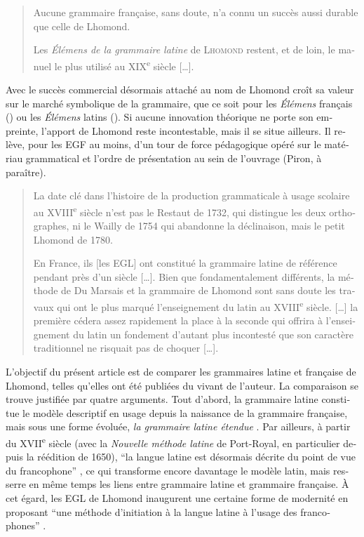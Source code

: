\documentclass[french,output=paper,colorlinks,citecolor=brown]{../langscibook}
\begin{document}
\begin{otherlanguage}{french}
\begin{quote}
    Aucune grammaire française, sans doute, n’a connu un succès aussi durable que celle de Lhomond. \citep[63]{Chervel1977}

    Les \textit{Élémens de la grammaire latine} de \textsc{Lhomond} restent, et de loin, le manuel le plus utilisé au XIX\textsuperscript{e} siècle […]. \citep[16]{Chervel1979}
\end{quote}

Avec le succès commercial désormais attaché au nom de Lhomond croît sa valeur sur le marché symbolique de la grammaire, que ce soit pour les \textit{Élémens} français (\citealt{Chervel1977, Chervel2006, ColombatEtAl2010}) ou les \textit{Élémens} latins (\citealt{Chervel1977, Colombat1999}). Si aucune innovation théorique ne porte son empreinte, l’apport de Lhomond reste incontestable, mais il se situe ailleurs. Il relève, pour les EGF au moins, d’un tour de force pédagogique opéré sur le matériau grammatical et l’ordre de présentation au sein de l’ouvrage (Piron, à paraître). 

\begin{quote}
La date clé dans l’histoire de la production grammaticale à usage scolaire au XVIII\textsuperscript{e} siècle n’est pas le Restaut de 1732, qui distingue les deux orthographes, ni le Wailly de 1754 qui abandonne la déclinaison, mais le petit Lhomond de 1780. \citep[220]{Chervel2006}

En France, ils [les EGL] ont constitué la grammaire latine de référence pendant près d’un siècle […]. Bien que fondamentalement différents, la méthode de Du Marsais et la grammaire de Lhomond sont sans doute les travaux qui ont le plus marqué l’enseignement du latin au XVIII\textsuperscript{e} siècle. […] la première cédera assez rapidement la place à la seconde qui offrira à l’enseignement du latin un fondement d’autant plus incontesté que son caractère traditionnel ne risquait pas de choquer […]. \citep[106]{Colombat1999}
\end{quote}

L’objectif du présent article est de comparer les grammaires latine et française de Lhomond, telles qu’elles ont été publiées du vivant de l’auteur. La comparaison se trouve justifiée par quatre arguments. Tout d’abord, la grammaire latine constitue le modèle descriptif en usage depuis la naissance de la grammaire française, mais sous une forme évoluée, \textit{la grammaire latine étendue} \citep{Auroux1994}. Par ailleurs, à partir du XVII\textsuperscript{e} siècle (avec la \textit{Nouvelle méthode latine} de Port-Royal, en particulier depuis la réédition de 1650), “la langue latine est désormais décrite du point de vue du francophone” \citep[11]{Colombat1995}, ce qui transforme encore davantage le modèle latin, mais resserre en même temps les liens entre grammaire latine et grammaire française. À cet égard, les EGL de Lhomond inaugurent une certaine forme de modernité en proposant “une méthode d’initiation à la langue latine à l’usage des francophones” \citep[166]{Colombat1999}.


\end{otherlanguage}
\end{document}
